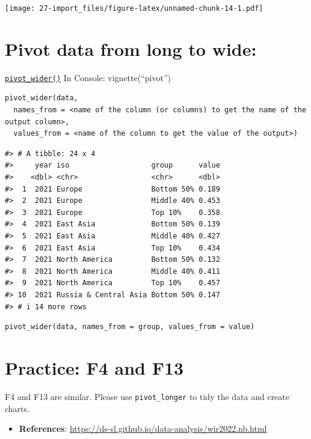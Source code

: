 \documentclass[
  xelatex, ja=standard]{bxjsbook}
\providecommand{\tightlist}{%
  \setlength{\itemsep}{0pt}\setlength{\parskip}{0pt}}
\theoremstyle{definition}
\theoremstyle{definition}
\theoremstyle{definition}
\theoremstyle{definition}
\theoremstyle{remark}
\begin{document}
\texttt{[image: 27-import\_files/figure-latex/unnamed-chunk-14-1.pdf]}

\hypertarget{pivot-data-from-long-to-wide}{%
\section{Pivot data from long to wide:}\label{pivot-data-from-long-to-wide}}

\href{https://tidyr.tidyverse.org/reference/pivot_wider.html}{\texttt{pivot\_wider()}} In Console: vignette(``pivot'')

\begin{verbatim}
pivot_wider(data, 
  names_from = <name of the column (or columns) to get the name of the output column>,
  values_from = <name of the column to get the value of the output>) 
\end{verbatim}

\begin{verbatim}
#> # A tibble: 24 x 4
#>     year iso                   group      value
#>    <dbl> <chr>                 <chr>      <dbl>
#>  1  2021 Europe                Bottom 50% 0.189
#>  2  2021 Europe                Middle 40% 0.453
#>  3  2021 Europe                Top 10%    0.358
#>  4  2021 East Asia             Bottom 50% 0.139
#>  5  2021 East Asia             Middle 40% 0.427
#>  6  2021 East Asia             Top 10%    0.434
#>  7  2021 North America         Bottom 50% 0.132
#>  8  2021 North America         Middle 40% 0.411
#>  9  2021 North America         Top 10%    0.457
#> 10  2021 Russia & Central Asia Bottom 50% 0.147
#> # i 14 more rows
\end{verbatim}

\begin{verbatim}
pivot_wider(data, names_from = group, values_from = value) 
\end{verbatim}

\hypertarget{practice-f4-and-f13}{%
\section{Practice: F4 and F13}\label{practice-f4-and-f13}}

F4 and F13 are similar. Please use \texttt{pivot\_longer} to tidy the data and create charts.

\begin{itemize}
\tightlist
\item
  \textbf{References}: \url{https://ds-sl.github.io/data-analysis/wir2022.nb.html}
\end{itemize}
\end{document}
